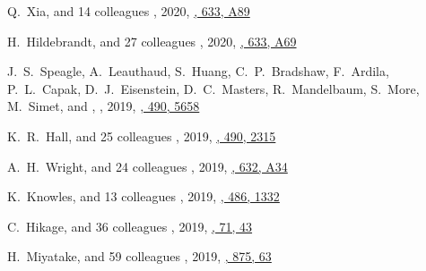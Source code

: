\begin{etaremune}
\item
Q.~Xia, and 14 colleagues
,
2020, \href{https://ui.adsabs.harvard.edu/abs/2020A&A...633A..89X}{\aap, 633, A89}

\item
H.~Hildebrandt, and 27 colleagues
,
2020, \href{https://ui.adsabs.harvard.edu/abs/2020A&A...633A..69H}{\aap, 633, A69}

\item
J.~S.~Speagle, A.~Leauthaud, S.~Huang, C.~P.~Bradshaw, F.~Ardila, P.~L.~Capak, D.~J.~Eisenstein, D.~C.~Masters, R.~Mandelbaum, S.~More, M.~Simet, and \myself,
,
2019, \href{https://ui.adsabs.harvard.edu/abs/2019MNRAS.490.5658S}{\mnras, 490, 5658}

\item
K.~R.~Hall, and 25 colleagues
,
2019, \href{https://ui.adsabs.harvard.edu/abs/2019MNRAS.490.2315H}{\mnras, 490, 2315}

\item
A.~H.~Wright, and 24 colleagues
,
2019, \href{https://ui.adsabs.harvard.edu/abs/2019A&A...632A..34W}{\aap, 632, A34}

\item
K.~Knowles, and 13 colleagues
,
2019, \href{https://ui.adsabs.harvard.edu/abs/2019MNRAS.486.1332K}{\mnras, 486, 1332}

\item
C.~Hikage, and 36 colleagues
,
2019, \href{https://ui.adsabs.harvard.edu/abs/2019PASJ...71...43H}{\pasj, 71, 43}

\item
H.~Miyatake, and 59 colleagues
,
2019, \href{https://ui.adsabs.harvard.edu/abs/2019ApJ...875...63M}{\apj, 875, 63}


\end{etaremune}
